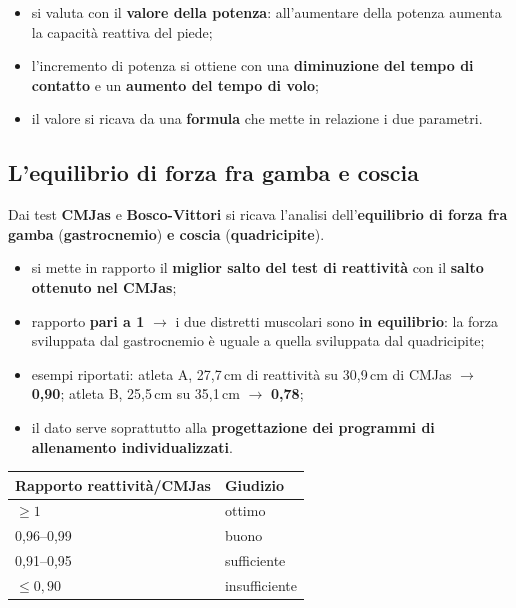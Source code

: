 \begin{itemize}
  \item si valuta con il \textbf{valore della potenza}: all'aumentare della potenza aumenta la
    capacità reattiva del piede;
  \item l'incremento di potenza si ottiene con una \textbf{diminuzione del tempo di contatto} e un
    \textbf{aumento del tempo di volo};
  \item il valore si ricava da una \textbf{formula} che mette in relazione i due parametri.
\end{itemize}

\subsection{L'equilibrio di forza fra gamba e coscia}

Dai test \textbf{CMJas} e \textbf{Bosco-Vittori} si ricava l'analisi dell'\textbf{equilibrio di forza
fra gamba} (\textbf{gastrocnemio}) \textbf{e coscia} (\textbf{quadricipite}).

\begin{itemize}
  \item si mette in rapporto il \textbf{miglior salto del test di reattività} con il \textbf{salto
    ottenuto nel CMJas};
  \item rapporto \textbf{pari a 1} $\rightarrow$ i due distretti muscolari sono \textbf{in
    equilibrio}: la forza sviluppata dal gastrocnemio è uguale a quella sviluppata dal quadricipite;
  \item esempi riportati: atleta A, 27,7\,cm di reattività su 30,9\,cm di CMJas $\rightarrow$
    \textbf{0,90}; atleta B, 25,5\,cm su 35,1\,cm $\rightarrow$ \textbf{0,78};
  \item il dato serve soprattutto alla \textbf{progettazione dei programmi di allenamento
    individualizzati}.
\end{itemize}

\begin{table}[htbp]
  \centering
  \small
  \renewcommand{\arraystretch}{1.3}
  \begin{tabularx}{\textwidth}{|l|X|}
    \hline
    \textbf{Rapporto reattività/CMJas} & \textbf{Giudizio} \\
    \hline
    $\geq 1$ & ottimo \\
    \hline
    0,96--0,99 & buono \\
    \hline
    0,91--0,95 & sufficiente \\
    \hline
    $\leq 0,90$ & insufficiente \\
    \hline
  \end{tabularx}
\end{table}

